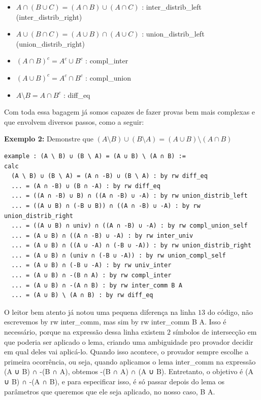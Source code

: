 \begin{itemize}
\item $A \cap (B \cup C) = (A \cap B) \cup (A \cap C)$ : {\selectfont inter\_distrib\_left} ({\selectfont inter\_distrib\_right})
\item $A \cup (B \cap C) = (A \cup B) \cap (A \cup C)$ : {\selectfont union\_distrib\_left} ({\selectfont union\_distrib\_right})
\item $(A \cap B)^c = A^c \cup B^c$ : {\selectfont compl\_inter}
\item $(A \cup B)^c = A^c \cap B^c$ : {\selectfont compl\_union}
\item $A \setminus B = A \cap B^c$ : {\selectfont diff\_eq}
\end{itemize}

Com toda essa bagagem já somos capazes de fazer provas bem mais complexas e que envolvem diversos passos, como a seguir:

\textbf{Exemplo 2:} Demonstre que $(A \setminus B) \cup (B \setminus A) = (A \cup B) \setminus (A \cap B)$
\begin{lstlisting}
example : (A \ B) ∪ (B \ A) = (A ∪ B) \ (A ∩ B) :=
calc
  (A \ B) ∪ (B \ A) = (A ∩ -B) ∪ (B \ A) : by rw diff_eq
  ... = (A ∩ -B) ∪ (B ∩ -A) : by rw diff_eq
  ... = ((A ∩ -B) ∪ B) ∩ ((A ∩ -B) ∪ -A) : by rw union_distrib_left
  ... = ((A ∪ B) ∩ (-B ∪ B)) ∩ ((A ∩ -B) ∪ -A) : by rw union_distrib_right
  ... = ((A ∪ B) ∩ univ) ∩ ((A ∩ -B) ∪ -A) : by rw compl_union_self
  ... = (A ∪ B) ∩ ((A ∩ -B) ∪ -A) : by rw inter_univ
  ... = (A ∪ B) ∩ ((A ∪ -A) ∩ (-B ∪ -A)) : by rw union_distrib_right
  ... = (A ∪ B) ∩ (univ ∩ (-B ∪ -A)) : by rw union_compl_self
  ... = (A ∪ B) ∩ (-B ∪ -A) : by rw univ_inter
  ... = (A ∪ B) ∩ -(B ∩ A) : by rw compl_inter
  ... = (A ∪ B) ∩ -(A ∩ B) : by rw inter_comm B A
  ... = (A ∪ B) \ (A ∩ B) : by rw diff_eq \end{lstlisting}

O leitor bem atento já notou uma pequena diferença na linha $13$ do código, não escrevemos {\selectfont by rw inter\_comm}, mas sim {\selectfont by rw inter\_comm B A}. Isso é necessário, porque na expressão dessa linha existem $2$ símbolos de intersecção em que poderia ser aplicado o lema, criando uma ambiguidade pro provador decidir em qual deles vai aplicá-lo. Quando isso acontece, o provador sempre escolhe a primeira ocorrência, ou seja, quando aplicamos o lema {\selectfont inter\_comm} na expressão {\selectfont (A ∪ B) ∩ -(B ∩ A)}, obtemos {\selectfont -(B ∩ A) ∩ (A ∪ B)}. Entretanto, o objetivo é {\selectfont (A ∪ B) ∩ -(A ∩ B)}, e para especificar isso, é só passar depois do lema os parâmetros que queremos que ele seja aplicado, no nosso caso, {\selectfont B A}.

